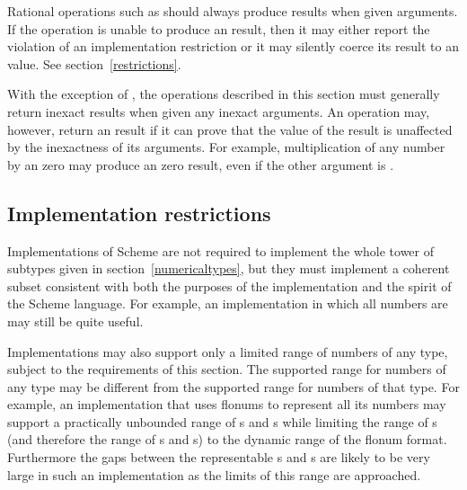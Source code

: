 \vest Rational operations such as \ide{+} should always produce
 results when given  arguments.
If the operation is unable to produce an  result,
then it may either report the violation of an implementation restriction
or it may silently coerce its
result to an  value.
See section~\ref{restrictions}.

\vest With the exception of , the operations described in
this section must generally return inexact results when given any inexact
arguments.  An operation may, however, return an  result if it can
prove that the value of the result is unaffected by the inexactness of its
arguments.  For example, multiplication of any number by an  zero
may produce an  zero result, even if the other argument is
.

\subsection{Implementation restrictions}

\label{restrictions}

\vest Implementations of Scheme are not required to implement the whole
tower of subtypes given in section~\ref{numericaltypes},
but they must implement a coherent subset consistent with both the
purposes of the implementation and the spirit of the Scheme language.
For example, an implementation in which all numbers are 
may still be quite useful.

\vest Implementations may also support only a limited range of numbers of
any type, subject to the requirements of this section.  The supported
range for  numbers of any type may be different from the
supported range for  numbers of that type.  For example,
an implementation that uses flonums to represent all its
  numbers may
support a practically unbounded range of  s
and s
while limiting the range of  s (and therefore
the range of  s and s)
to the dynamic range of the flonum format.
Furthermore
the gaps between the representable  s and
s are
likely to be very large in such an implementation as the limits of this
range are approached.

